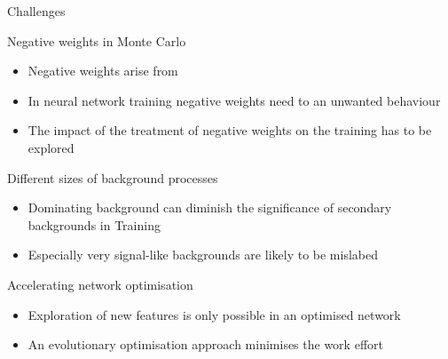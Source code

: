 \begin{frame}{Challenges}
    \begin{block}{Negative weights in Monte Carlo}
        \begin{itemize}
            \item Negative weights arise from
            \item In neural network training negative weights need to an unwanted behaviour
            \item The impact of the treatment of negative weights on the training has to be explored
        \end{itemize}
    \end{block}
    \begin{block}{Different sizes of background processes}
        \begin{itemize}
            \item Dominating background can diminish the significance of secondary backgrounds in Training
            \item Especially very signal-like backgrounds are likely to be mislabed
        \end{itemize}
    \end{block}
    \begin{block}{Accelerating network optimisation}
        \begin{itemize}
            \item Exploration of new features is only possible in an optimised network
            \item An evolutionary optimisation approach minimises the work effort
        \end{itemize}
    \end{block}
\end{frame}